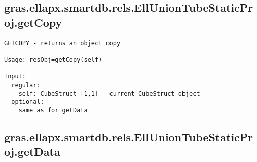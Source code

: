 \subsection{\texorpdfstring{gras.ellapx.smartdb.rels.EllUnionTubeStaticProj.getCopy}{getCopy}}\label{method:gras.ellapx.smartdb.rels.EllUnionTubeStaticProj.getCopy}
\begin{verbatim}
GETCOPY - returns an object copy

Usage: resObj=getCopy(self)

Input:
  regular:
    self: CubeStruct [1,1] - current CubeStruct object
  optional:
    same as for getData
\end{verbatim}
\subsection{\texorpdfstring{gras.ellapx.smartdb.rels.EllUnionTubeStaticProj.getData}{getData}}\label{method:gras.ellapx.smartdb.rels.EllUnionTubeStaticProj.getData}
